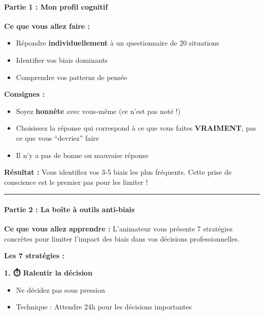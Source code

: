 \documentclass[
]{article}
\providecommand{\tightlist}{%
  \setlength{\itemsep}{0pt}\setlength{\parskip}{0pt}}
\begin{document}
\paragraph{\texorpdfstring{\textbf{Partie 1 : Mon profil cognitif
}}{Partie 1 : Mon profil cognitif }}\label{partie-1-mon-profil-cognitif}

\textbf{Ce que vous allez faire :}

\begin{itemize}
\tightlist
\item
  Répondre \textbf{individuellement} à un questionnaire de 20 situations
\item
  Identifier vos biais dominants
\item
  Comprendre vos patterns de pensée
\end{itemize}

\textbf{Consignes :}

\begin{itemize}
\tightlist
\item
  Soyez \textbf{honnête} avec vous-même (ce n'est pas noté !)
\item
  Choisissez la réponse qui correspond à ce que vous faites
  \textbf{VRAIMENT}, pas ce que vous ``devriez'' faire
\item
  Il n'y a pas de bonne ou mauvaise réponse
\end{itemize}

\textbf{Résultat :} Vous identifiez vos 3-5 biais les plus fréquents.
Cette prise de conscience est le premier pas pour les limiter !

\begin{center}\rule{0.5\linewidth}{0.5pt}\end{center}

\paragraph{\texorpdfstring{\textbf{Partie 2 : La boîte à outils
anti-biais}}{Partie 2 : La boîte à outils anti-biais}}\label{partie-2-la-bouxeete-uxe0-outils-anti-biais}

\textbf{Ce que vous allez apprendre :} L'animateur vous présente 7
stratégies concrètes pour limiter l'impact des biais dans vos décisions
professionnelles.

\textbf{Les 7 stratégies :}

\textbf{1. ⏱️ Ralentir la décision}

\begin{itemize}
\tightlist
\item
  Ne décidez pas sous pression
\item
  Technique : Attendre 24h pour les décisions importantes
\end{itemize}
\end{document}
